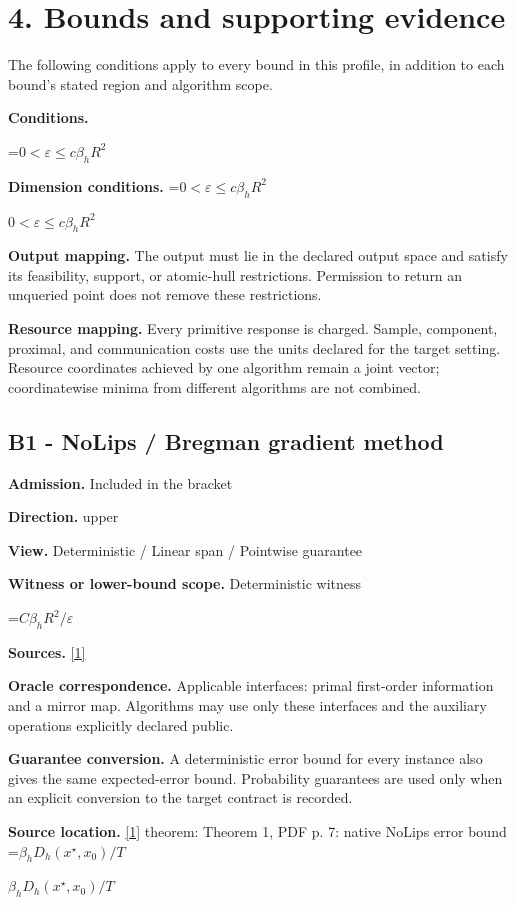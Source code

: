 \documentclass[10pt,a4paper]{article}
\newcommand{\AtlasMath}[1]{\par\begingroup\centering\setbox0=\hbox{$\displaystyle #1$}\ifdim\wd0>1.4\linewidth\typeout{ATLAS WIDE FORMULA: \the\wd0}\fi\ifdim\wd0>\linewidth\resizebox{\linewidth}{!}{\box0}\else\box0\fi\par\endgroup}
\newcommand{\AtlasInlineMath}[1]{\begingroup\setbox0=\hbox{$#1$}\ifdim\wd0>.4\linewidth\endgroup\AtlasMath{#1}\else\endgroup$#1$\fi}
\begin{document}
\section{4. Bounds and supporting evidence}
The following conditions apply to every bound in this profile, in addition to each bound's stated region and algorithm scope.

\textbf{Conditions.} 
\AtlasMath{0<\varepsilon\le c\beta_hR^2}


\textbf{Dimension conditions.} \AtlasInlineMath{0<\varepsilon\le c\beta_hR^2}

\textbf{Output mapping.} The output must lie in the declared output space and satisfy its feasibility, support, or atomic-hull restrictions. Permission to return an unqueried point does not remove these restrictions.

\textbf{Resource mapping.} Every primitive response is charged. Sample, component, proximal, and communication costs use the units declared for the target setting. Resource coordinates achieved by one algorithm remain a joint vector; coordinatewise minima from different algorithms are not combined.

\subsection{B1 - NoLips / Bregman gradient method}
\textbf{Admission.} Included in the bracket

\textbf{Direction.} upper

\textbf{View.} Deterministic / Linear span / Pointwise guarantee

\textbf{Witness or lower-bound scope.} Deterministic witness

\AtlasMath{C\beta_hR^2/\varepsilon}
\textbf{Sources.} \href{https://arxiv.org/pdf/1911.08510v3}{[1]}

\textbf{Oracle correspondence.} Applicable interfaces: primal first-order information and a mirror map. Algorithms may use only these interfaces and the auxiliary operations explicitly declared public.

\textbf{Guarantee conversion.} A deterministic error bound for every instance also gives the same expected-error bound. Probability guarantees are used only when an explicit conversion to the target contract is recorded.

\textbf{Source location.} \href{https://arxiv.org/pdf/1911.08510v3}{[1]} theorem: Theorem 1, PDF p. 7: native NoLips error bound \AtlasInlineMath{\beta_hD_h(x^\star,x_0)/T}
\end{document}
